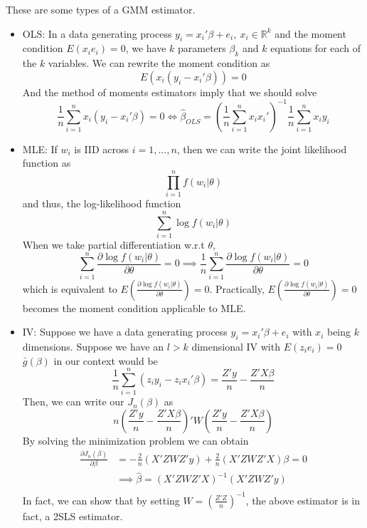 \begin{mdframed}[backgroundcolor=yellow!5] 
\begin{example} These are some types of a GMM estimator. 
\begin{itemize}
\item OLS: In a data generating process $y_i = x_i'\beta+e_i,\ x_i\in\mathbb{R}^k$ and the moment condition $E(x_ie_i)=0$, we have $k$ parameters $\beta_k$  and $k$ equations for each of the $k$ variables. We can rewrite the moment condition as
\[
E(x_i(y_i-x_i'\beta))=0
\]
And the method of moments estimators imply that we should solve 
\[
\frac{1}{n}\sum_{i=1}^nx_i(y_i-x_i'\beta)=0\iff \hat{\beta}_{OLS}=\left(\frac{1}{n}\sum_{i=1}^n x_ix_i'\right)^{-1}\frac{1}{n}\sum_{i=1}^n x_iy_i
\]
\item MLE: If $w_i$ is IID across $i=1,...,n$, then we can write the joint likelihood function as
\[
\prod_{i=1}^nf(w_i|\theta)
\]
and thus, the log-likelihood function
\[
\sum_{i=1}^n \log f(w_i|\theta)
\]
When we take partial differentiation w.r.t $\theta$, 
\[
\sum_{i=1}^n \frac{\partial \log f(w_i|\theta)}{\partial \theta}=0 \implies \frac{1}{n}\sum_{i=1}^n \frac{\partial \log f(w_i|\theta)}{\partial \theta}=0 
\]
which is equivalent to $E\left(\frac{\partial \log f(w_i|\theta)}{\partial \theta}\right)=0$. Practically, $E\left(\frac{\partial \log f(w_i|\theta)}{\partial \theta}\right)=0$ becomes the moment condition applicable to MLE.
\item IV: Suppose we have a data generating process $y_i=x_i'\beta+e_i$ with $x_i$ being $k$ dimensions.  Suppose we have an $l>k$ dimensional IV with $E(z_ie_i)=0$  $\bar{g}(\beta)$ in our context would be
\[
\frac{1}{n}\sum_{i=1}^n(z_iy_i-z_ix_i'\beta) = \frac{Z'y}{n}-\frac{Z'X\beta}{n}
\]
Then, we can write our $J_n(\beta)$ as
\[
n\left(\frac{Z'y}{n}-\frac{Z'X\beta}{n} \right)'W\left(\frac{Z'y}{n}-\frac{Z'X\beta}{n} \right)
\]
By solving the minimization problem we can obtain
\[
\begin{aligned}
\frac{\partial J_n(\beta)}{\partial \beta}&=-\frac{2}{n}(X'ZWZ'y)+\frac{2}{n}(X'ZWZ'X)\beta=0\\
&\implies\hat{\beta}=(X'ZWZ'X)^{-1}(X'ZWZ'y)\\
\end{aligned}
\]
In fact, we can show that by setting $W=\left(\frac{Z'Z}{n}\right)^{-1}$, the above estimator is in fact, a 2SLS estimator. 
\end{itemize}
\end{example}
\end{mdframed}
